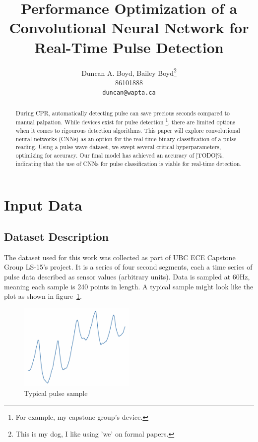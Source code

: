 \documentclass{article}
\title{Performance Optimization of a Convolutional Neural Network for Real-Time Pulse Detection}
\author{
  Duncan A. Boyd, Bailey Boyd\thanks{This is my dog, I like using 'we' on formal papers.} \\
  86101888 \\
  \texttt{duncan@wapta.ca} \\
}
\begin{document}
\maketitle


\begin{abstract}
  During CPR, automatically detecting pulse can save precious seconds compared to manual palpation. While devices exist for pulse detection \footnote{For example, my capstone group's device.}, there are limited options when it comes to rigourous detection algorithms. This paper will explore convolutional neural networks (CNNs) as an option for the real-time binary classification of a pulse reading. Using a pulse wave dataset, we swept several critical hyperparameters, optimizing for accuracy. Our final model has achieved an accuracy of [TODO]\%, indicating that the use of CNNs for pulse classification is viable for real-time detection.
\end{abstract}


\section{Input Data}


\subsection{Dataset Description}


The dataset used for this work was collected as part of UBC ECE Capstone Group LS-15's project. It is a series of four second segments, each a time series of pulse data described as sensor values (arbitrary units). Data is sampled at 60Hz, meaning each sample is 240 points in length. A typical sample might look like the plot as shown in figure~\ref{fig:data_example}.

\begin{figure}[H]
    \centering
    \includegraphics[width=0.5\textwidth]{../media/raw_pulse.png}
    \caption{Typical pulse sample}
    \label{fig:data_example}
\end{figure}
\end{document}

